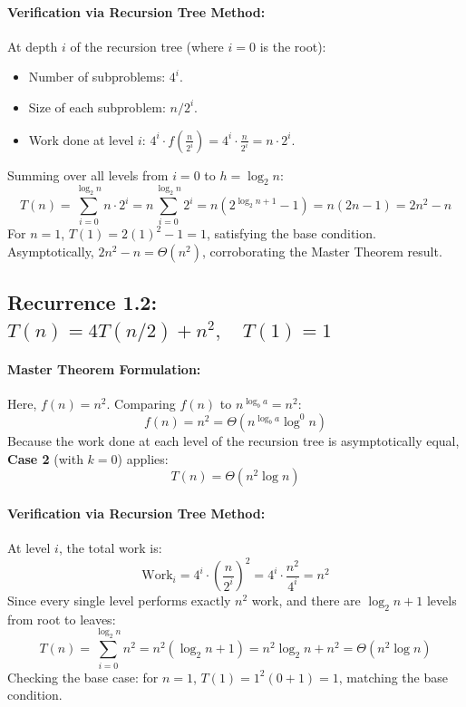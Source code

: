 \documentclass[12pt,a4paper]{article}
\theoremstyle{plain}
\theoremstyle{definition}
\theoremstyle{remark}
\begin{document}
\paragraph{Verification via Recursion Tree Method:}
At depth $i$ of the recursion tree (where $i = 0$ is the root):
\begin{itemize}
    \item Number of subproblems: $4^i$.
    \item Size of each subproblem: $n / 2^i$.
    \item Work done at level $i$: $4^i \cdot f\left(\frac{n}{2^i}\right) = 4^i \cdot \frac{n}{2^i} = n \cdot 2^i$.
\end{itemize}
Summing over all levels from $i = 0$ to $h = \log_2 n$:
\begin{equation}
T(n) = \sum_{i=0}^{\log_2 n} n \cdot 2^i = n \sum_{i=0}^{\log_2 n} 2^i = n \left(2^{\log_2 n + 1} - 1\right) = n (2n - 1) = 2n^2 - n
\end{equation}
For $n = 1$, $T(1) = 2(1)^2 - 1 = 1$, satisfying the base condition. Asymptotically, $2n^2 - n = \Theta(n^2)$, corroborating the Master Theorem result.

\subsection{Recurrence 1.2: \texorpdfstring{$T(n) = 4 T(n/2) + n^2, \quad T(1) = 1$}{T(n) = 4T(n/2) + n\textasciicircum 2, T(1) = 1}}

\paragraph{Master Theorem Formulation:}
Here, $f(n) = n^2$. Comparing $f(n)$ to $n^{\log_b a} = n^2$:
\begin{equation}
f(n) = n^2 = \Theta\left(n^{\log_b a} \log^0 n\right)
\end{equation}
Because the work done at each level of the recursion tree is asymptotically equal, \textbf{Case 2} (with $k = 0$) applies:
\begin{equation}
\boxed{T(n) = \Theta\left(n^2 \log n\right)}
\end{equation}

\paragraph{Verification via Recursion Tree Method:}
At level $i$, the total work is:
\begin{equation}
\text{Work}_i = 4^i \cdot \left(\frac{n}{2^i}\right)^2 = 4^i \cdot \frac{n^2}{4^i} = n^2
\end{equation}
Since every single level performs exactly $n^2$ work, and there are $\log_2 n + 1$ levels from root to leaves:
\begin{equation}
T(n) = \sum_{i=0}^{\log_2 n} n^2 = n^2 (\log_2 n + 1) = n^2 \log_2 n + n^2 = \Theta\left(n^2 \log n\right)
\end{equation}
Checking the base case: for $n = 1$, $T(1) = 1^2 (0 + 1) = 1$, matching the base condition.
\end{document}
